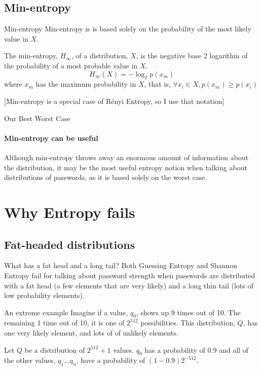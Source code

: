 \documentclass[xcolor={dvipsnames,table}]{beamer}
\begin{document}
\subsection{Min-entropy}

\begin{frame}{Min-entropy}
Min-entropy is is based solely on the probability of the most likely value in $X$.
\begin{definition}\label{def:minH}
The min-entropy, $H_\infty$, of a distribution, $X$, is the negative base 2 logarithm of the probability of a most probable value in $X$.
$$
H_\infty(X) = -\log_2 p(x_m)
$$
where $x_m$ has the maximum probability in $X$, that is, $\forall x_i \in X, p(x_m) \geq p(x_i)$
\end{definition}
[Min-entropy is a special case of Rényi Entropy, so I use that notation]
\end{frame}

\begin{frame}{Our Best Worst Case}
\framesubtitle{Min-entropy can be useful}
Although min-entropy throws away an enormous amount of information about the distribution, it may be the most useful entropy notion when talking about distributions of passwords, as it is based solely on the worst case.

\end{frame}

\section{Why Entropy fails}
\subsection{Fat-headed distributions}

\begin{frame}{What has a fat head and a long tail?}
Both Guessing Entropy and Shannon Entropy fail for talking about password strength when passwords are distributed with a fat head (a few elements that are very likely) and a long thin tail (lots of low probability elements).
\end{frame}

\begin{frame}{An extreme example}
Imagine if a value, $q_0$, shows up 9 times out of 10. The remaining 1 time out of 10, it is one of $2^{512}$ possibilities. This distribution, $Q$, has one very likely element, and lots of of unlikely elements.

\begin{definition} \label{def:Q}
Let $Q$ be a distribution of $2^{512}+1$ values. $q_0$ has a probability of $0.9$ and all of the other values, $q_1 \dots q_n$,
have a probability of $(1-0.9)2^{-512}$.
\end{definition}
\end{frame}
\end{document}

